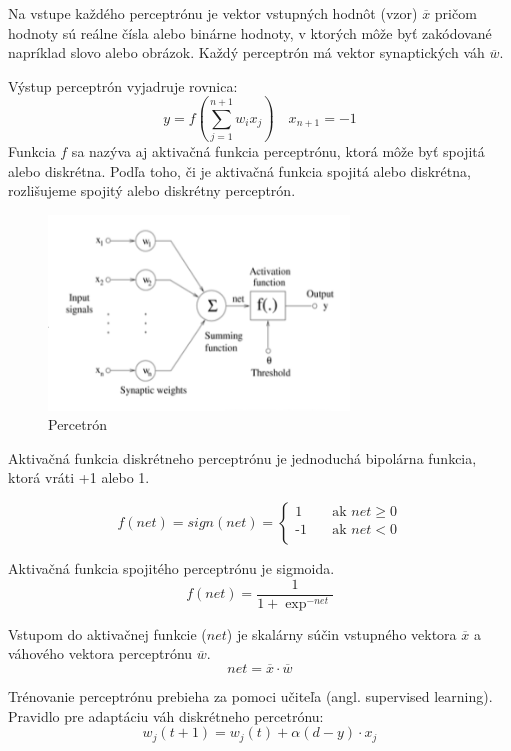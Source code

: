Na vstupe každého perceptrónu je vektor vstupných hodnôt (vzor) $\overline{x}$ pričom hodnoty sú reálne čísla alebo binárne hodnoty, v ktorých môže byť zakódované
napríklad slovo alebo obrázok. Každý perceptrón má vektor synaptických váh $\overline{w}$. 

Výstup perceptrón vyjadruje rovnica:
\begin{equation}
	y = f (\sum_{j=1}^{n+1} w_{i} x_{j}) \quad x_{n+1} = -1
\end{equation}
Funkcia $f$ sa nazýva aj aktivačná funkcia perceptrónu, ktorá môže byť spojitá alebo diskrétna. 
Podľa toho, či je  aktivačná funkcia spojitá alebo diskrétna, rozlišujeme spojitý alebo diskrétny
perceptrón.

\begin{figure}[H]
	\centering
	\includegraphics[width=8cm]{assets/perceptron}
	\caption{Percetrón}
\end{figure}

Aktivačná funkcia diskrétneho perceptrónu je jednoduchá bipolárna funkcia, ktorá vráti +1 alebo 1.

\[
f(net) = sign(net) =
     \begin{cases}
       \text{1} &\quad\text{ak } net \geq 0 \\
       \text{-1} &\quad\text{ak } net < 0 \\
     \end{cases}
\]


Aktivačná funkcia spojitého perceptrónu je sigmoida.
\begin{equation}
f(net) = \frac{1}{1 + \exp^{-net}}  
\end{equation}

Vstupom do aktivačnej funkcie ($net$) je skalárny súčin vstupného vektora $\overline{x}$ a 
váhového vektora perceptrónu $\overline{w}$.
\begin{equation}
	net = \overline{x} \cdot \overline{w}
\end{equation}

Trénovanie perceptrónu prebieha za pomoci učiteľa (angl. supervised learning).
Pravidlo pre adaptáciu váh diskrétneho percetrónu:
\begin{equation}
	w_j(t+1) = w_j(t) + \alpha (d - y)\cdot x_j
\end{equation}

